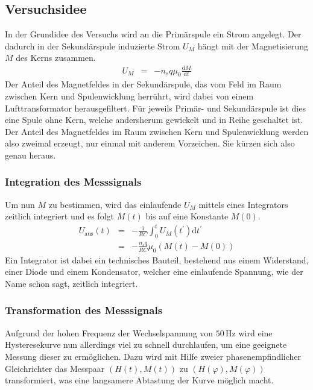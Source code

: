 \documentclass[12pt,a4paper]{scrartcl}
\numberwithin{equation}{section} %
\begin{document}
\hypertarget{versuchsidee}{%
\subsection{Versuchsidee}\label{versuchsidee}}
In der Grundidee des Versuchs wird an die Primärspule ein Strom angelegt. Der dadurch in der Sekundärspule induzierte Strom $U_M$ hängt mit der Magnetisierung $M$ des Kerns zusammen.
\begin{eqnarray}
    U_M &=& -n_s q \mu_0 \frac{\mathrm dM}{\mathrm dt}
\end{eqnarray}
Der Anteil des Magnetfeldes in der Sekundärspule, das vom Feld im Raum zwischen Kern und Spulenwicklung herrührt, wird dabei von einem Lufttransformator herausgefiltert. Für jeweils Primär- und Sekundärspule ist dies eine Spule ohne Kern, welche andersherum gewickelt und in Reihe geschaltet ist. Der Anteil des Magnetfeldes im Raum zwischen Kern und Spulenwicklung werden also zweimal erzeugt, nur einmal mit anderem Vorzeichen. Sie kürzen sich also genau heraus.

\hypertarget{integration-des-messsignals}{%
\subsubsection{Integration des Messsignals}\label{integration-des-messsignals}}
Um nun $M$ zu bestimmen, wird das einlaufende $U_M$ mittels eines Integrators zeitlich integriert und es folgt $M(t)$ bis auf eine Konstante $M(0)$.
\begin{eqnarray}
    U_\mathrm{aus}(t)
        &=& -\frac{1}{R C} \int_{0}^{t} U_M(t^{\prime}) \mathrm dt^{\prime} \\
        &=& -\frac{n_s q}{R C} \mu_0 (M(t) - M(0))
\end{eqnarray}
Ein Integrator ist dabei ein technisches Bauteil, bestehend aus einem Widerstand, einer Diode und einem Kondensator, welcher eine einlaufende Spannung, wie der Name schon sagt, zeitlich integriert.

\hypertarget{transformation-des-messsignals}{%
\subsubsection{Transformation des Messsignals}\label{transformation-des-messsignals}}
Aufgrund der hohen Frequenz der Wechselspannung von $50\,\mathrm{Hz}$ wird eine Hysteresekurve nun allerdings viel zu schnell durchlaufen, um eine geeignete Messung dieser zu ermöglichen. Dazu wird mit Hilfe zweier phasenempfindlicher Gleichrichter das Messpaar $(H(t), M(t))$ zu $(H(\varphi), M(\varphi))$ transformiert, was eine langsamere Abtastung der Kurve möglich macht.
\end{document}
